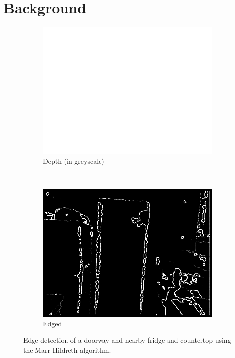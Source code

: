 
\section{Background}
\label{sec:background}

\begin{figure}
    \centering
    \begin{subfigure}[t]{0.5\textwidth}
        \centering
        \includegraphics[height=.7\textwidth]{figs/Depth814.png}
        \caption{Depth (in greyscale)}
        \label{fig:814:depth}
    \end{subfigure}%
    ~ 
    \begin{subfigure}[t]{0.5\textwidth}
        \centering
        \includegraphics[height=.7\textwidth]{figs/Edged814.png}
        \caption{Edged}
        \label{fig:814:edged}
    \end{subfigure}
    \caption{Edge detection of a doorway and nearby fridge and countertop using the Marr-Hildreth algorithm.}
\end{figure}


